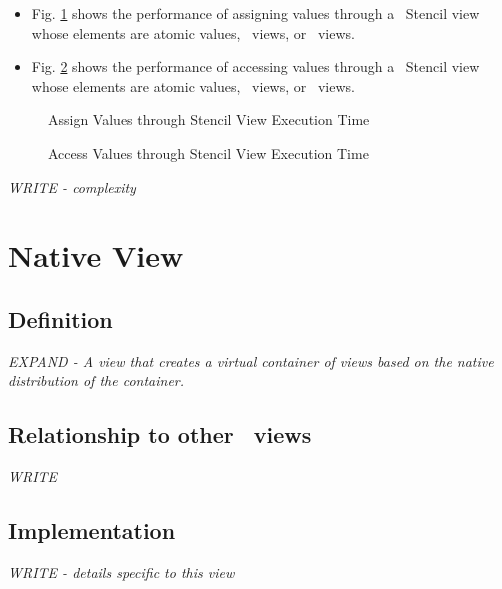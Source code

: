 \begin{itemize}
\item
Fig. \ref{fig:sten-vw-assign-exper}
shows the performance of assigning values through a \stapl\ Stencil view
whose elements are atomic values, \stl\ views, or \stapl\ views.
\item
Fig. \ref{fig:sten-vw-access-exper}
shows the performance of accessing values through a \stapl\ Stencil view
whose elements are atomic values, \stl\ views, or \stapl\ views.
\end{itemize}

\begin{figure}[p]
\caption{Assign Values through Stencil View Execution Time}
\label{fig:sten-vw-assign-exper}
\end{figure}

\begin{figure}[p]
\caption{Access Values through Stencil View Execution Time}
\label{fig:sten-vw-access-exper}
\end{figure}

\emph{WRITE - complexity}


\section{Native View} \label{sec-nat-vw}

\subsection{Definition}

\textit{EXPAND - A view that creates a virtual container of views based on
the native distribution of the container.}

\subsection{Relationship to other \stapl\ views}

\textit{WRITE}

\subsection{Implementation}

\textit{WRITE - details specific to this view}

